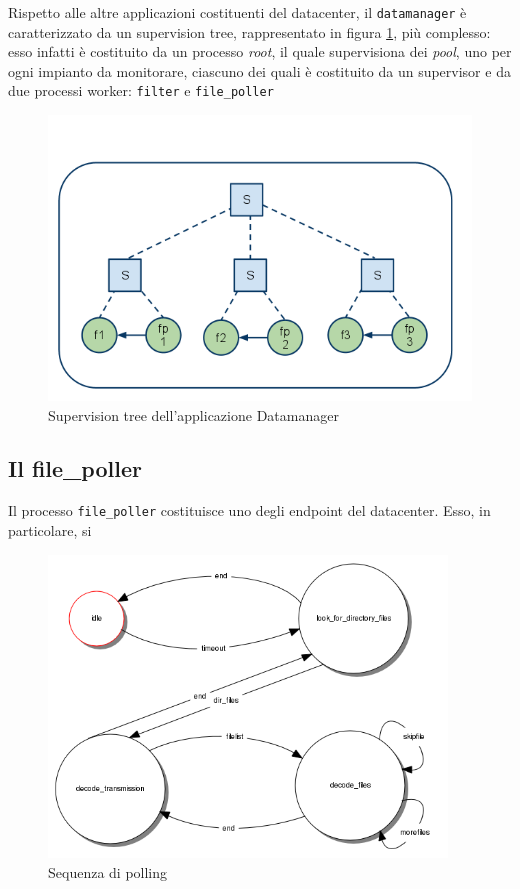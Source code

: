 %
Rispetto alle altre applicazioni costituenti del datacenter, il \texttt{datamanager} \`e 
caratterizzato da un supervision tree, rappresentato in figura \ref{datamanagersuptree},
pi\`u complesso: esso infatti \`e costituito da un processo \emph{root}, il quale supervisiona
dei \emph{pool}, uno per ogni impianto da monitorare, ciascuno dei quali \`e costituito da un 
supervisor e da due processi worker: \texttt{filter} e \texttt{file\_poller}
%
\begin{figure}[!h]
\centering
\includegraphics[width=380pt]{img/datamanager.png}
\caption{Supervision tree dell'applicazione Datamanager}
\label{datamanagersuptree}
\end{figure}
%

%
\subsection{Il file\_poller}
%
Il processo \texttt{file\_poller} costituisce uno degli endpoint del datacenter.
%
Esso, in particolare, si 


%
\begin{figure}[!h]
\centering
\includegraphics[width=300pt]{img/file-poller.png}
\caption{Sequenza di polling}
\end{figure}
%

